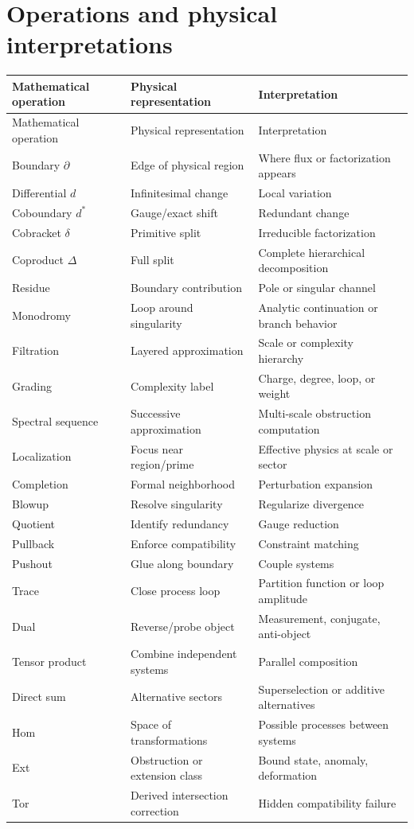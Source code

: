\documentclass[11pt]{article}
\begin{document}
\section{Operations and physical interpretations}
\begin{longtable}{@{}>{\raggedright\arraybackslash}p{}>{\raggedright\arraybackslash}p{}>{\raggedright\arraybackslash}p{}@{}}
\toprule
Mathematical operation & Physical representation & Interpretation\\
\midrule
\endfirsthead
\toprule
Mathematical operation & Physical representation & Interpretation\\
\midrule
\endhead
\bottomrule
\endfoot
Boundary $\partial$ & Edge of physical region & Where flux or factorization appears\\
Differential $d$ & Infinitesimal change & Local variation\\
Coboundary $d^\ast$ & Gauge/exact shift & Redundant change\\
Cobracket $\delta$ & Primitive split & Irreducible factorization\\
Coproduct $\Delta$ & Full split & Complete hierarchical decomposition\\
Residue & Boundary contribution & Pole or singular channel\\
Monodromy & Loop around singularity & Analytic continuation or branch behavior\\
Filtration & Layered approximation & Scale or complexity hierarchy\\
Grading & Complexity label & Charge, degree, loop, or weight\\
Spectral sequence & Successive approximation & Multi-scale obstruction computation\\
Localization & Focus near region/prime & Effective physics at scale or sector\\
Completion & Formal neighborhood & Perturbation expansion\\
Blowup & Resolve singularity & Regularize divergence\\
Quotient & Identify redundancy & Gauge reduction\\
Pullback & Enforce compatibility & Constraint matching\\
Pushout & Glue along boundary & Couple systems\\
Trace & Close process loop & Partition function or loop amplitude\\
Dual & Reverse/probe object & Measurement, conjugate, anti-object\\
Tensor product & Combine independent systems & Parallel composition\\
Direct sum & Alternative sectors & Superselection or additive alternatives\\
Hom & Space of transformations & Possible processes between systems\\
Ext & Obstruction or extension class & Bound state, anomaly, deformation\\
Tor & Derived intersection correction & Hidden compatibility failure\\
\end{longtable}
\end{document}
